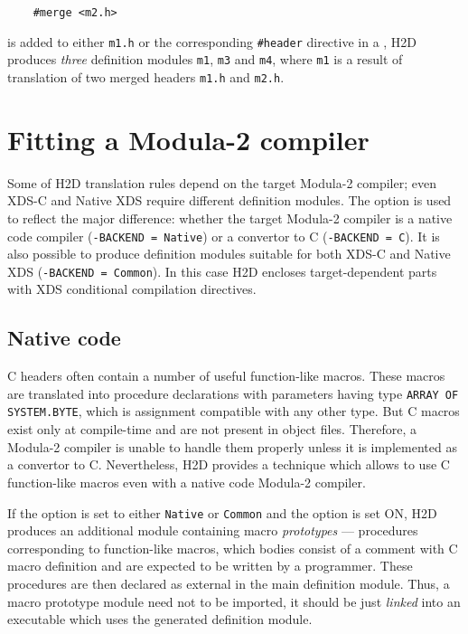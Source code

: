 \verb'    #merge <m2.h>'

is added to either {\tt m1.h} or the corresponding \verb'#header'
directive in a \ProjectFile{}, H2D produces
{\em three} definition modules {\tt m1}, {\tt m3} and {\tt m4}, where {\tt m1}
is a result of translation of two merged headers {\tt m1.h} and {\tt m2.h}.

\section{Fitting a Modula-2 compiler}
\label{using:fit}

Some of H2D translation rules depend on the target Modula-2 compiler;
even XDS-C and Native XDS require different definition modules.
The  option is used to reflect the major difference:
whether the target Modula-2 compiler is a native code compiler
(\verb'-BACKEND = Native') or a convertor to C (\verb'-BACKEND = C').
It is also possible to produce definition modules suitable for both XDS-C
and Native XDS (\verb'-BACKEND = Common'). In this case H2D encloses
target-dependent parts with XDS conditional compilation directives.

\subsection{Native code}
\label{using:fit:native}

C headers often contain a number of useful function-like macros.
These macros are translated into procedure declarations with
parameters having type \verb'ARRAY OF SYSTEM.BYTE', which is assignment
compatible with any other type. But C macros exist only at compile-time
and are not present in object files. Therefore, a Modula-2 compiler is
unable to handle them properly unless it is implemented as a convertor to C.
Nevertheless, H2D provides a technique which allows to use C function-like
macros even with a native code Modula-2 compiler.

If the  option is set to either \verb'Native' or \verb'Common'
and the  option is set ON, H2D produces an additional
module containing macro {\it prototypes} --- procedures corresponding to
function-like macros, which bodies consist of a comment with C macro
definition and are expected to be written by a programmer.
These procedures are then declared as external in the main definition module.
Thus, a macro prototype module need not to be imported, it should be just
{\em linked} into an executable which uses the generated definition module.

